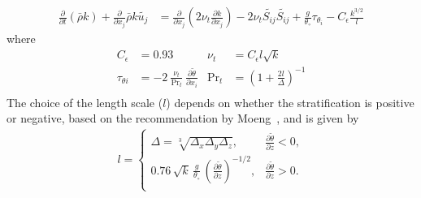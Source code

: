 \begin{align}
  \frac{\partial}{\partial t}\left(\bar{\rho} k \right) + \frac{\partial}{\partial x_j} \bar{\rho} k \widetilde{u_j} &= \frac{\partial}{\partial x_j} \left (2 \nu_t \frac{\partial k}{\partial x_j} \right) - 2 \nu_t \widetilde{S_{ij}} \widetilde{S_{ij}} + \frac{g}{\theta_\circ} \tau_{\theta_i} - C_{\epsilon} \frac{k^{3/2}}{l} \label{eqn:ksgs-les}
\end{align}
where
\begin{align}
  C_\epsilon &= 0.93 & \nu_t &= C_\epsilon l \sqrt{k} \\
  \tau_{\theta i} &= - 2\ \frac{\nu_t}{\mathrm{Pr}_t}\ \frac{\partial \widetilde{\theta}}{\partial x_i} & \mathrm{Pr}_t &= \left( 1 + \frac{2l}{\Delta} \right)^{-1} \\
\end{align}
The choice of the length scale ($l$) depends on whether the stratification is positive
or negative, based on the recommendation by Moeng~\cite{Moeng1984}, and is given
by
\begin{align}
  l =
  \begin{cases}
    \Delta = \sqrt[3]{\Delta_x \Delta_y \Delta_z}, & \frac{\partial \widetilde{\theta}}{\partial z} < 0 , \\
    0.76\, \sqrt{k}\, \frac{g}{\theta_\circ}\, \left( \frac{\partial \widetilde{\theta}}{\partial z}\right)^{-1/2}, &  \frac{\partial \widetilde{\theta}}{\partial z} > 0 .\\
  \end{cases}
\end{align}

